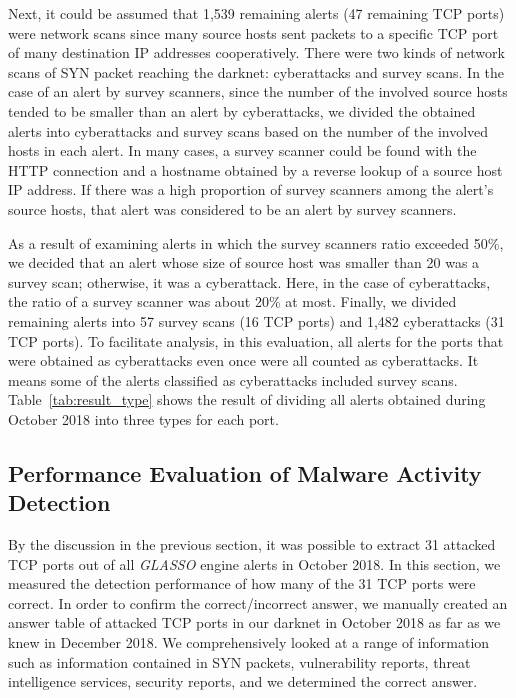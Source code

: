 \documentclass[conference]{IEEEtran}
\begin{document}
Next, it could be assumed that 1,539 remaining alerts (47 remaining TCP ports) were network scans since many source hosts sent packets to a specific TCP port of many destination IP addresses cooperatively.
There were two kinds of network scans of SYN packet reaching the darknet: cyberattacks and survey scans.
In the case of an alert by survey scanners, since the number of the involved source hosts tended to be smaller than an alert by cyberattacks, we divided the obtained alerts into cyberattacks and survey scans based on the number of the involved hosts in each alert.
In many cases, a survey scanner could be found with the HTTP connection and a hostname obtained by a reverse lookup of a source host IP address.
If there was a high proportion of survey scanners among the alert's source hosts, that alert was considered to be an alert by survey scanners.

As a result of examining alerts in which the survey scanners ratio exceeded 50\%, we decided that an alert whose size of source host was smaller than 20 was a survey scan; otherwise, it was a cyberattack.
Here, in the case of cyberattacks, the ratio of a survey scanner was about 20\% at most.
Finally, we divided remaining alerts into 57 survey scans (16 TCP ports) and 1,482 cyberattacks (31 TCP ports).
To facilitate analysis, in this evaluation, all alerts for the ports that were obtained as cyberattacks even once were all counted as cyberattacks.
It means some of the alerts classified as cyberattacks included survey scans.
Table~\ref{tab:result_type} shows the result of dividing all alerts obtained during October 2018 into three types for each port.



\subsection{Performance Evaluation of Malware Activity Detection}
\label{Performance}
By the discussion in the previous section, it was possible to extract 31 attacked TCP ports out of all \textit{GLASSO} engine alerts in October 2018.
In this section, we measured the detection performance of how many of the 31 TCP ports were correct.
In order to confirm the correct/incorrect answer, we manually created an answer table of attacked TCP ports in our darknet in October 2018 as far as we knew in December 2018.
We comprehensively looked at a range of information such as information contained in SYN packets, vulnerability reports, threat intelligence services, security reports, and we determined the correct answer.
\end{document}
